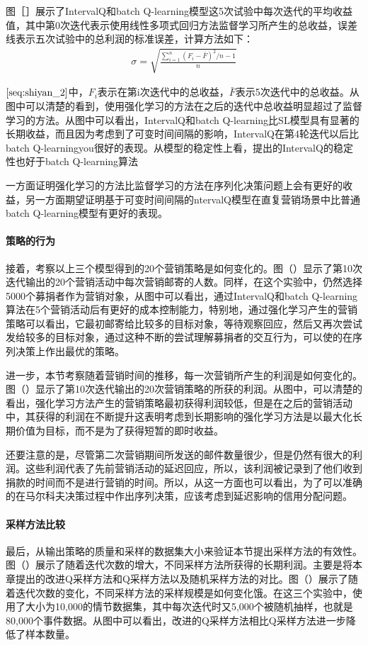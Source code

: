 图［］展示了IntervalQ和batch Q-learning模型这5次试验中每次迭代的平均收益值，其中第0次迭代表示使用线性多项式回归方法监督学习所产生的总收益，误差线表示五次试验中的总利润的标准误差，计算方法如下：
\begin{equation}\label{seq:shiyan_2}
\begin{aligned}
\sigma = \sqrt{\frac{\sum_{i=1}^{n}(F_{i}-\bar{F})^{2}/n-1}{n}}
\end{aligned}
\end{equation}

$\eqref{seq:shiyan_2}$中，$F_{i}$表示在第i次迭代中的总收益，$\bar{F}$表示5次迭代中的总收益。从图中可以清楚的看到，使用强化学习的方法在之后的迭代中总收益明显超过了监督学习的方法。从图中可以看出，IntervalQ和batch Q-learning比SL模型具有显著的长期收益，而且因为考虑到了可变时间间隔的影响，IntervalQ在第4轮迭代以后比batch Q-learningyou很好的表现。从模型的稳定性上看，提出的IntervalQ的稳定性也好于batch Q-learning算法

一方面证明强化学习的方法比监督学习的方法在序列化决策问题上会有更好的收益，另一方面期望证明基于可变时间间隔的ntervalQ模型在直复营销场景中比普通batch Q-learning模型有更好的表现。

\paragraph{策略的行为}
接着，考察以上三个模型得到的20个营销策略是如何变化的。图（）显示了第10次迭代输出的20个营销活动中每次营销邮寄的人数。同样，在这个实验中，仍然选择5000个募捐者作为营销对象，从图中可以看出，通过IntervalQ和batch Q-learning算法在5个营销活动后有更好的成本控制能力，特别地，通过强化学习产生的营销策略可以看出，它最初邮寄给比较多的目标对象，等待观察回应，然后又再次尝试发给较多的目标对象，通过这种不断的尝试理解募捐者的交互行为，可以使的在序列决策上作出最优的策略。

进一步，本节考察随着营销时间的推移，每一次营销所产生的利润是如何变化的。图（）显示了第10次迭代输出的20次营销策略的所获的利润。从图中，可以清楚的看出，强化学习方法产生的营销策略最初获得利润较低，但是在之后的营销活动中，其获得的利润在不断提升这表明考虑到长期影响的强化学习方法是以最大化长期价值为目标，而不是为了获得短暂的即时收益。

还要注意的是，尽管第二次营销期间所发送的邮件数量很少，但是仍然有很大的利润。这些利润代表了先前营销活动的延迟回应，所以，该利润被记录到了他们收到捐款的时间而不是进行营销的时间。所以，从这一方面也可以看出，为了可以准确的在马尔科夫决策过程中作出序列决策，应该考虑到延迟影响的信用分配问题。

\paragraph{采样方法比较}
最后，从输出策略的质量和采样的数据集大小来验证本节提出采样方法的有效性。图（）展示了随着迭代次数的增大，不同采样方法所获得的长期利润。主要是将本章提出的改进Q采样方法和Q采样方法以及随机采样方法的对比。图（）展示了随着迭代次数的变化，不同采样方法的采样规模是如何变化饿。在这三个实验中，使用了大小为10,000的情节数据集，其中每次迭代时又5,000个被随机抽样，也就是80,000个事件数据。从图中可以看出，改进的Q采样方法相比Q采样方法进一步降低了样本数量。

